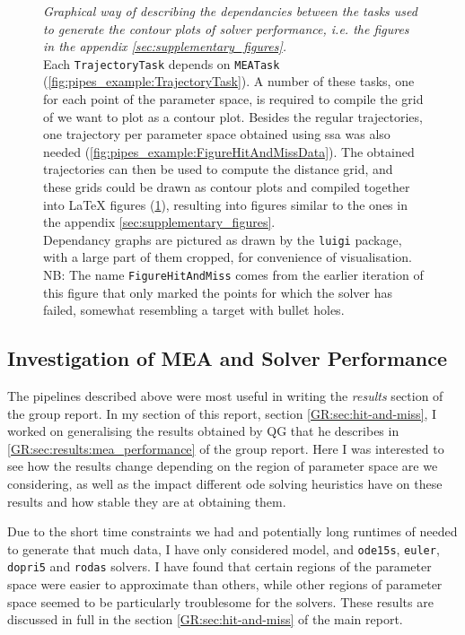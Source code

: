 \begin{figure}
\begin{subfigure}[t]{\textwidth}
        \label{fig:pipes_example:FigureHitAndMissTex}
    \end{subfigure}
    \caption{\emph{Graphical way of describing the dependancies between the tasks used to generate the contour plots of solver performance, i.e. the figures in the appendix \autoref{sec:supplementary_figures}.}\\ 
    Each  \texttt{TrajectoryTask} depends on \texttt{MEATask} (\ref{fig:pipes_example:TrajectoryTask}).
    A number of these tasks, one for each point of the parameter space, is required to compile the grid of we want to plot as a contour plot.
    Besides the regular trajectories, one trajectory per parameter space obtained using \acrlong{ssa} was also needed (\ref{fig:pipes_example:FigureHitAndMissData}).
    The obtained trajectories can then be used to compute the distance grid, and these grids could be drawn as contour plots and compiled together into \LaTeX{} figures (\ref{fig:pipes_example:FigureHitAndMissTex}), resulting into figures similar to the ones in the appendix \autoref{sec:supplementary_figures}.\\
    Dependancy graphs are pictured as drawn by the {\tt luigi} package, with a large part of them cropped, for convenience of visualisation.\\
    NB: The name {\tt FigureHitAndMiss} comes from the earlier iteration of this figure that only marked the points for which the solver has failed, somewhat resembling a target with bullet holes.}
    \label{fig:pipes_example}
\end{figure}

\subsection{Investigation of MEA and Solver Performance}

The pipelines described above were most useful in writing the \emph{results} section of the group report. In my section of this report, section \autoref{GR:sec:hit-and-miss}, I worked on generalising the results obtained by QG that he describes in \autoref{GR:sec:results:mea_performance} of the group report. 
Here I was interested to see how the results change depending on the region of parameter space are we considering, as well as the impact different \gls{ode} solving heuristics have on these results and how stable they are at obtaining them.

Due to the short time constraints we had and potentially long runtimes of needed to generate that much data, I have only considered \pft{} model, and \texttt{ode15s}, \texttt{euler}, \texttt{dopri5} and \texttt{rodas} solvers. 
I have found that certain regions of the parameter space were easier to approximate than others, while other regions of parameter space seemed to be particularly troublesome for the solvers. 
These results are discussed in full in the section \autoref*{GR:sec:hit-and-miss} of the main report.

